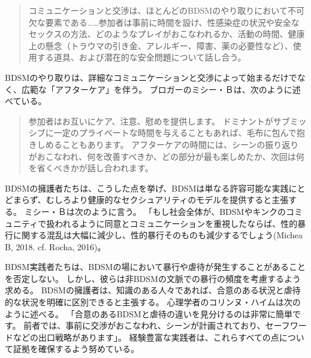 \documentclass[paper=a4,book,openany]{jlreq} \usepackage{mystyle}
\begin{document}
\begin{quote}
コミュニケーションと交渉は、ほとんどのBDSMのやり取りにおいて不可欠な要素である……参加者は事前に時間を設け、性感染症の状況や安全なセックスの方法、どのようなプレイがおこなわれるか、活動の時間、健康上の懸念（トラウマの引き金、アレルギー、障害、薬の必要性など）、使用する道具、および潜在的な安全問題について話し合う。
\citep[p.887]{kattari15:_gettin_it}

\end{quote}

BDSMのやり取りは、詳細なコミュニケーションと交渉によって始まるだけでなく、広範な「アフターケア」を伴う。
ブロガーのミシー・Ｂは、次のように述べている。

\begin{quote}
参加者はお互いにケア、注意、慰めを提供します。
ドミナントがサブミッシブに一定のプライベートな時間を与えることもあれば、毛布に包んで抱きしめることもあります。
アフターケアの時間には、シーンの振り返りがおこなわれ、何を改善すべきか、どの部分が最も楽しめたか、次回は何を省くべきかが話し合われます。
\citep{michea18:_can_bdsm_teach_us_what}
\end{quote}

BDSMの擁護者たちは、こうした点を挙げ、BDSMは単なる許容可能な実践にとどまらず、むしろより健康的なセクシュアリティのモデルを提供すると主張する。
ミシー・Ｂは次のように言う。
「もし社会全体が、BDSMやキンクのコミュニティで扱われるように同意とコミュニケーションを重視したならば、性的暴行に関する混乱は大幅に減少し、性的暴行そのものも減少するでしょう(Michea B, 2018. cf. Rocha, 2016)。
\nocite{rocha16:_aggres_hook_ups}

BDSM実践者たちは、BDSMの場において暴行や虐待が発生することがあることを否定しない。
しかし、彼らは非BDSMの文脈での暴行の頻度を考慮するよう求める。
BDSMの擁護者は、知識のある人々であれば、合意のある状況と虐待的な状況を明確に区別できると主張する。
心理学者のコリンヌ・ハイムは次のように述べる。
「合意のあるBDSMと虐待の違いを見分けるのは非常に簡単です。
前者では、事前に交渉がおこなわれ、シーンが計画されており、セーフワードなどの出口戦略があります」\citep{mcarthur16:_its_traves_that_bdsm_isnt_techn_legal}。
経験豊富な実践者は、これらすべての点について証拠を確保するよう努めている。
\end{document}
